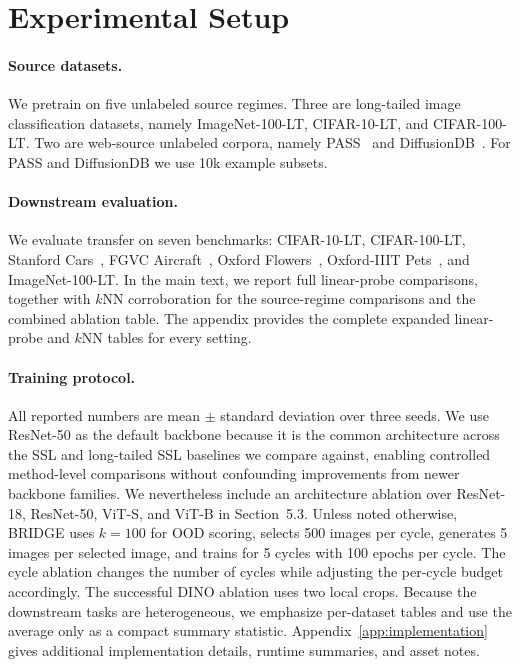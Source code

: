 \documentclass{article}
\begin{document}
\section{Experimental Setup}
\paragraph{Source datasets.}
We pretrain on five unlabeled source regimes. Three are long-tailed image classification datasets, namely ImageNet-100-LT, CIFAR-10-LT, and CIFAR-100-LT. Two are web-source unlabeled corpora, namely PASS~\citep{pass} and DiffusionDB~\citep{diffusiondb}. For PASS and DiffusionDB we use 10k example subsets.

\paragraph{Downstream evaluation.}
We evaluate transfer on seven benchmarks: CIFAR-10-LT, CIFAR-100-LT, Stanford Cars~\citep{cars}, FGVC Aircraft~\citep{aircraft}, Oxford Flowers~\citep{flowers}, Oxford-IIIT Pets~\citep{pets}, and ImageNet-100-LT. In the main text, we report full linear-probe comparisons, together with $k$NN corroboration for the source-regime comparisons and the combined ablation table. The appendix provides the complete expanded linear-probe and $k$NN tables for every setting.

\paragraph{Training protocol.}
All reported numbers are mean $\pm$ standard deviation over three seeds. We use ResNet-50 as the default backbone because it is the common architecture across the SSL and long-tailed SSL baselines we compare against, enabling controlled method-level comparisons without confounding improvements from newer backbone families. We nevertheless include an architecture ablation over ResNet-18, ResNet-50, ViT-S, and ViT-B in Section~5.3. Unless noted otherwise, BRIDGE uses $k = 100$ for OOD scoring, selects 500 images per cycle, generates 5 images per selected image, and trains for 5 cycles with 100 epochs per cycle. The cycle ablation changes the number of cycles while adjusting the per-cycle budget accordingly. The successful DINO ablation uses two local crops. Because the downstream tasks are heterogeneous, we emphasize per-dataset tables and use the average only as a compact summary statistic. Appendix~\ref{app:implementation} gives additional implementation details, runtime summaries, and asset notes.
\end{document}
